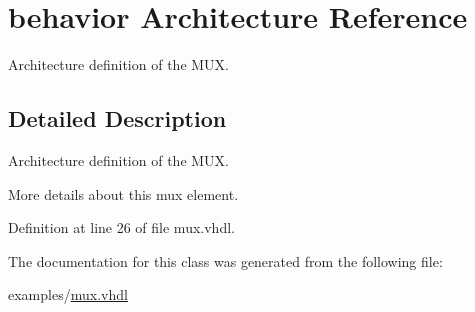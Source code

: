 \hypertarget{classmux__using__with_1_1behavior}{}\section{behavior Architecture Reference}
\label{classmux__using__with_1_1behavior}


Architecture definition of the M\+UX.  




\subsection{Detailed Description}
Architecture definition of the M\+UX. 

More details about this mux element. 

Definition at line 26 of file mux.\+vhdl.



The documentation for this class was generated from the following file\+:\begin{DoxyCompactItemize}
\item 
examples/\mbox{\hyperlink{mux_8vhdl}{mux.\+vhdl}}\end{DoxyCompactItemize}
